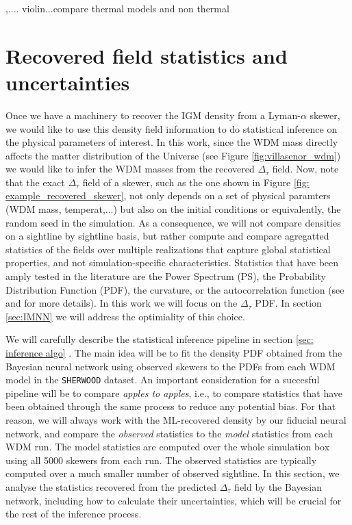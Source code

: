  ,.... violin...compare thermal models and non thermal










\section{Recovered field statistics and uncertainties}\label{sec:recovered statistics}
Once we have a machinery to recover the IGM density from a Lyman-$\alpha$ skewer, we would like to use this density field information to do statistical inference on the physical parameters of interest. In this work, since the WDM mass directly affects the matter distribution of the Universe (see Figure \ref{fig:villasenor_wdm}) we would like to infer the WDM masses from the recovered $\Delta_\tau$ field. Now, note that the exact $\Delta_\tau$ field of a skewer, such as the one shown in Figure \ref{fig: example_recovered_skewer}, not only depends on a set of physical paramters (WDM mass, temperat,...) but also on the initial conditions or equivalently, the random seed in the simulation. As a consequence, we will not compare densities on a sightline by sightline basis, but rather compute and compare agregatted statistics of the fields over multiple realizations that capture global statistical properties, and not simulation-specific characteristics. Statistics that have been amply tested in the literature are the Power Spectrum (PS), the Probability Distribution Function (PDF), the curvature, or the autocorrelation function (see \cite{Gaikwad_2021} and \cite{wolfson2023forecastingconstraintshighzigm} for more details). In this work we will focus on the $\Delta_\tau$ PDF. In section \ref{sec:IMNN} we will address the optimiality of this choice. 

We will carefully describe the statistical inference pipeline in section \ref{sec: inference algo} . The main idea will be to fit the density PDF obtained from the Bayesian neural network using observed skewers to the PDFs from each WDM model in the \texttt{SHERWOOD} dataset. An important consideration for a succesful pipeline will be to compare \emph{apples to apples}, i.e., to compare statistics that have been obtained through the same process to reduce any potential bias. For that reason, we will always work with the ML-recovered density by our fiducial neural network, and compare the \emph{observed} statistics to the \emph{model} statistics from each WDM run. The model statistics are computed over the whole simulation box using all 5000 skewers from each run. The observed statistics are typically computed over a much smaller number of observed sightline. In this section, we analyse the statistics recovered from the predicted $\Delta_\tau$ field by the Bayesian network, including how to calculate their uncertainties, which will be crucial for the rest of the inference process.

